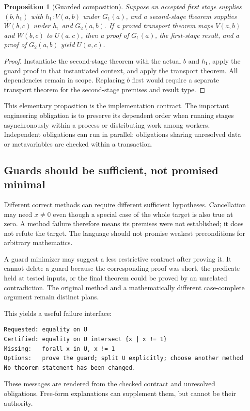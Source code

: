 \documentclass[11pt,a4paper]{article}
\newtheorem{proposition}{Proposition}[section]
\theoremstyle{remark}\newtheorem{example}[proposition]{Example}
\begin{document}
\begin{proposition}[Guarded composition]
Suppose an accepted first stage supplies $(b,h_1)$ with $h_1:V(a,b)$ under $G_1(a)$, and a second-stage theorem supplies $W(b,c)$ under $h_1$ and $G_2(a,b)$. If a proved transport theorem maps $V(a,b)$ and $W(b,c)$ to $U(a,c)$, then a proof of $G_1(a)$, the first-stage result, and a proof of $G_2(a,b)$ yield $U(a,c)$.
\end{proposition}
\begin{proof}
Instantiate the second-stage theorem with the actual $b$ and $h_1$, apply the guard proof in that instantiated context, and apply the transport theorem. All dependencies remain in scope. Replacing $b$ first would require a separate transport theorem for the second-stage premises and result type.
\end{proof}
This elementary proposition is the implementation contract. The important engineering obligation is to preserve its dependent order when running stages asynchronously within a process or distributing work among workers. Independent obligations can run in parallel; obligations sharing unresolved data or metavariables are checked within a transaction.

\subsection{Guards should be sufficient, not promised minimal}
Different correct methods can require different sufficient hypotheses. Cancellation may need $x\ne0$ even though a special case of the whole target is also true at zero. A method failure therefore means its premises were not established; it does not refute the target. The language should not promise weakest preconditions for arbitrary mathematics.

A guard minimizer may suggest a less restrictive contract after proving it. It cannot delete a guard because the corresponding proof was short, the predicate held at tested inputs, or the final theorem could be proved by an unrelated contradiction. The original method and a mathematically different case-complete argument remain distinct plans.

This yields a useful failure interface:
\begin{lstlisting}
Requested: equality on U
Certified: equality on U intersect {x | x != 1}
Missing:   forall x in U, x != 1
Options:   prove the guard; split U explicitly; choose another method
No theorem statement has been changed.
\end{lstlisting}
These messages are rendered from the checked contract and unresolved obligations. Free-form explanations can supplement them, but cannot be their authority.
\end{document}
